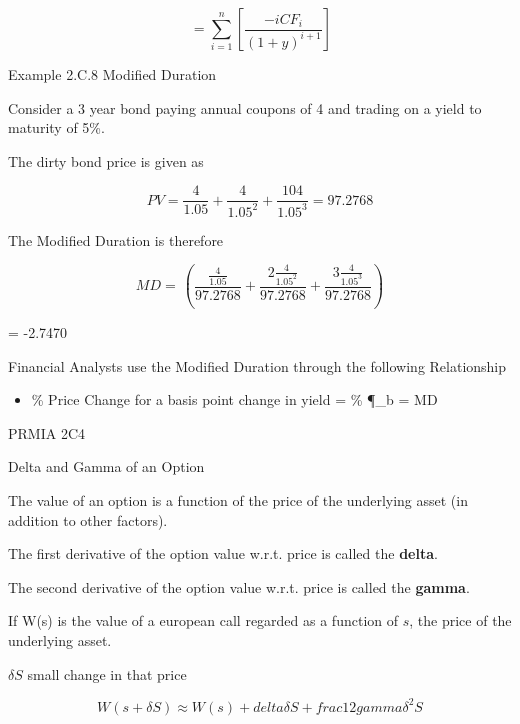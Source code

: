\[ \frac{}{} =  \sum^n_{i=1} \left[ \frac{-i CF_i}{(1+y)^{i+1}}\right] \]


Example 2.C.8 Modified Duration

Consider a 3 year bond paying annual coupons of 4 and trading on a yield to maturity of 5\%.

The dirty bond price is given as

\[ PV =  \frac{4}{1.05} +  \frac{4}{1.05^2} + \frac{104}{1.05^3} = 97.2768 \]

The Modified Duration is therefore

\[ MD = \frac{}{} \left( \frac{\frac{4}{1.05}}{97.2768} + \frac{2\frac{4}{1.05^2}}{97.2768} +\frac{3\frac{4}{1.05^3}}{97.2768} \right) \]

= -2.7470


Financial Analysts use the Modified Duration through the following Relationship

\begin{itemize}
\item \% Price Change for a basis point change in yield = \% \Del \P_b = MD \]
\end{itemize}



PRMIA 2C4

Delta and Gamma of an Option

The value of an option is a function of the price of the underlying asset (in addition to other factors).

The first derivative of the option value w.r.t. price is called the \textbf{delta}.

The second derivative of the option value w.r.t. price is called the \textbf{gamma}.

If W(s) is the value of a european call regarded as a function of $s$, the price of the underlying asset.

$\delta S$ small change in that price

\[ W(s + \delta S) \approx W(s) + delta \delta S + frac{1}{2}gamma \delta^2 S\]


